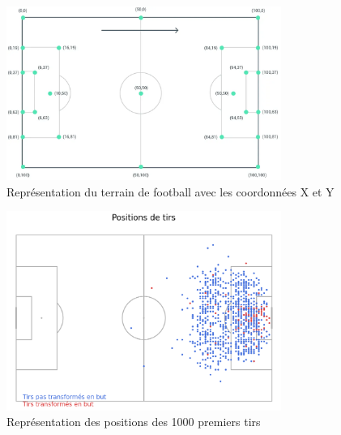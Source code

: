 \documentclass[12pt]{article}
\begin{document}
\begin{figure}[htp]
    \centering
    \includegraphics[width=0.8\textwidth]{img/CoordTerrain.png}
    \caption{Représentation du terrain de football avec les coordonnées X et Y}
    \label{fig:terrain}
\end{figure}

\begin{figure}[htp]
    \centering
    \includegraphics[width=0.8\textwidth]{img/PositionTirsDatasetEvent.png}
    \caption{Représentation des positions des 1000 premiers tirs}
    \label{fig:events_tirs_emplacements}
\end{figure}



\newpage
\end{document}
